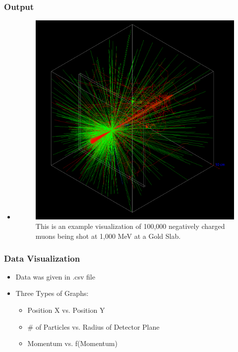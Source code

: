 \documentclass[aspectratio-169]{beamer}
\begin{document}
\begin{frame}
\frametitle{Output}
\begin{itemize}
    \item 
    \begin{minipage}{0.5\textwidth}
        \begin{figure}
            \centering
            \includegraphics[width=\textwidth]{output.png}
            \caption{This is an example visualization of 100,000 negatively charged muons being shot at 1,000 MeV at a Gold Slab.}
        \end{figure}
    \end{minipage}
\end{itemize}
\end{frame}

\begin{frame}
\frametitle{Data Visualization}
\begin{itemize}
\item Data was given in .csv file
\item Three Types of Graphs:
    \begin{itemize}
    \item Position X vs. Position Y
    \item \# of Particles vs. Radius of Detector Plane
    \item Momentum vs. f(Momentum)
    \end{itemize}
\end{itemize}
\end{frame}
\end{document}
